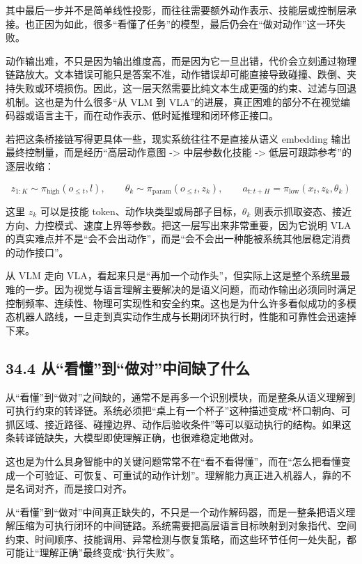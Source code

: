 其中最后一步并不是简单线性投影，而往往需要额外动作表示、技能层或控制层承接。也正因为如此，很多“看懂了任务”的模型，最后仍会在“做对动作”这一环失败。

动作输出难，不只是因为输出维度高，而是因为它一旦出错，代价会立刻通过物理链路放大。文本错误可能只是答案不准，动作错误却可能直接导致碰撞、跌倒、夹持失败或环境损伤。因此，这一层天然需要比纯文本生成更强的约束、过滤与回退机制。这也是为什么很多“从 VLM 到 VLA”的进展，真正困难的部分不在视觉编码器或语言主干，而在动作表示、低时延推理和闭环修正接口。

若把这条桥接链写得更具体一些，现实系统往往不是直接从语义 embedding 输出最终控制量，而是经历“高层动作意图 -> 中层参数化技能 -> 低层可跟踪参考”的逐层收缩：

\begingroup
\scriptsize
\begin{equation*}
z_{1:K} \sim \pi_{\mathrm{high}}(o_{\le t}, l), \qquad
\theta_k \sim \pi_{\mathrm{param}}(o_{\le t}, z_k), \qquad
a_{t:t+H} = \pi_{\mathrm{low}}(x_t, z_k, \theta_k)
\end{equation*}
\endgroup

这里 \(z_k\) 可以是技能 token、动作块类型或局部子目标，\(\theta_k\) 则表示抓取姿态、接近方向、力控模式、速度上界等参数。把这一层写出来非常重要，因为它说明 VLA 的真实难点并不是“会不会出动作”，而是“会不会出一种能被系统其他层稳定消费的动作接口”。

从 VLM 走向 VLA，看起来只是“再加一个动作头”，但实际上这是整个系统里最难的一步。因为视觉与语言理解主要解决的是语义问题，而动作输出必须同时满足控制频率、连续性、物理可实现性和安全约束。这也是为什么许多看似成功的多模态机器人路线，一旦走到真实动作生成与长期闭环执行时，性能和可靠性会迅速掉下来。

\subsection*{34.4 从“看懂”到“做对”中间缺了什么}


从“看懂”到“做对”之间缺的，通常不是再多一个识别模块，而是整条从语义理解到可执行约束的转译链。系统必须把“桌上有一个杯子”这种描述变成“杯口朝向、可抓区域、接近路径、碰撞边界、动作后验收条件”等可以驱动执行的结构。如果这条转译链缺失，大模型即使理解正确，也很难稳定地做对。

这也是为什么具身智能中的关键问题常常不在“看不看得懂”，而在“怎么把看懂变成一个可验证、可恢复、可重试的动作计划”。理解能力真正进入机器人，靠的不是名词对齐，而是接口对齐。

从“看懂”到“做对”中间真正缺失的，不只是一个动作解码器，而是一整条把语义理解压缩为可执行闭环的中间链路。系统需要把高层语言目标映射到对象指代、空间约束、时间顺序、技能调用、异常检测与恢复策略，而这些环节任何一处失配，都可能让“理解正确”最终变成“执行失败”。

